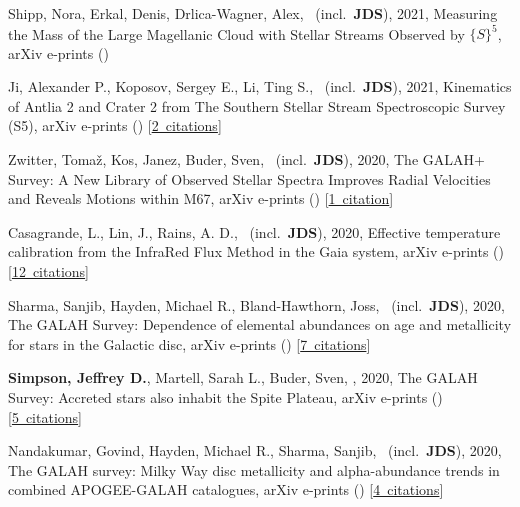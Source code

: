 \item[{\color{numcolor}\scriptsize9}] Shipp, Nora, Erkal, Denis, Drlica-Wagner, Alex, \etal\ (incl.\ \textbf{JDS}), 2021, Measuring the Mass of the Large Magellanic Cloud with Stellar Streams Observed by ${\{}S{\}}^5$, arXiv e-prints ()

\item[{\color{numcolor}\scriptsize8}] Ji, Alexander P., Koposov, Sergey E., Li, Ting S., \etal\ (incl.\ \textbf{JDS}), 2021, Kinematics of Antlia 2 and Crater 2 from The Southern Stellar Stream Spectroscopic Survey (S5), arXiv e-prints () [\href{https://ui.adsabs.harvard.edu/#abs/2021arXiv210612656J}{2~citations}]

\item[{\color{numcolor}\scriptsize7}] Zwitter, Toma{\v{z}}, Kos, Janez, Buder, Sven, \etal\ (incl.\ \textbf{JDS}), 2020, The GALAH+ Survey: A New Library of Observed Stellar Spectra Improves Radial Velocities and Reveals Motions within M67, arXiv e-prints () [\href{https://ui.adsabs.harvard.edu/#abs/2020arXiv201212201Z}{1~citation}]

\item[{\color{numcolor}\scriptsize6}] Casagrande, L., Lin, J., Rains, A. D., \etal\ (incl.\ \textbf{JDS}), 2020, Effective temperature calibration from the InfraRed Flux Method in the Gaia system, arXiv e-prints () [\href{https://ui.adsabs.harvard.edu/#abs/2020arXiv201102517C}{12~citations}]

\item[{\color{numcolor}\scriptsize5}] Sharma, Sanjib, Hayden, Michael R., Bland-Hawthorn, Joss, \etal\ (incl.\ \textbf{JDS}), 2020, The GALAH Survey: Dependence of elemental abundances on age and metallicity for stars in the Galactic disc, arXiv e-prints () [\href{https://ui.adsabs.harvard.edu/#abs/2020arXiv201113818S}{7~citations}]

\item[{\color{numcolor}\scriptsize4}] \textbf{Simpson, Jeffrey D.}, Martell, Sarah L., Buder, Sven, \etal, 2020, The GALAH Survey: Accreted stars also inhabit the Spite Plateau, arXiv e-prints () [\href{https://ui.adsabs.harvard.edu/#abs/2020arXiv201102659S}{5~citations}]

\item[{\color{numcolor}\scriptsize3}] Nandakumar, Govind, Hayden, Michael R., Sharma, Sanjib, \etal\ (incl.\ \textbf{JDS}), 2020, The GALAH survey: Milky Way disc metallicity and alpha-abundance trends in combined APOGEE-GALAH catalogues, arXiv e-prints () [\href{https://ui.adsabs.harvard.edu/#abs/2020arXiv201102783N}{4~citations}]

